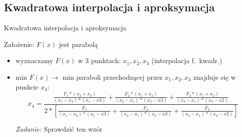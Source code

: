\subsection{Kwadratowa interpolacja i aproksymacja}
  \begin{frame}{Kwadratowa interpolacja i aproksymacja}
    \begin{block}{Założenie: $F(x)$ jest parabolą}
      \begin{itemize}
        \item wyznaczamy $F(x)$ w 3 punktach: $x_{1}{,}x_{2}{,}x_{3}$
        (interpolacja f.~kwadr.)
        \item min $F(x) \to$ min paraboli przechodzącej przez
        $x_{1}{,}x_{2}{,}x_{3}$ znajduje się w punkcie $x_4$:
        \begin{displaymath}
          x_4 = \frac{
            \frac{F_{1}*(x_{2}+x_{3})}{(x_{1}-x_{2})*(x_{1}-x{3})} +
            \frac{F_{2}*(x_{1}+x_{3})}{(x_{2}-x_{1})*(x_{2}-x{3})} +
            \frac{F_{3}*(x_{1}+x_{2})}{(x_{3}-x_{1})*(x_{3}-x{2})}
          }{2 * [
            \frac{F_{1}}{(x_{1}-x_{2})*(x_{1}-x{3})} +
            \frac{F_{2}}{(x_{2}-x_{1})*(x_{2}-x{3})} +
            \frac{F_{3}}{(x_{3}-x_{1})*(x_{3}-x{2})}
          ]}
        \end{displaymath}
        \begin{flushright}
          \emph{Zadanie:} Sprawdzić ten wzór
        \end{flushright}
      \end{itemize}
    \end{block}
  \end{frame}


